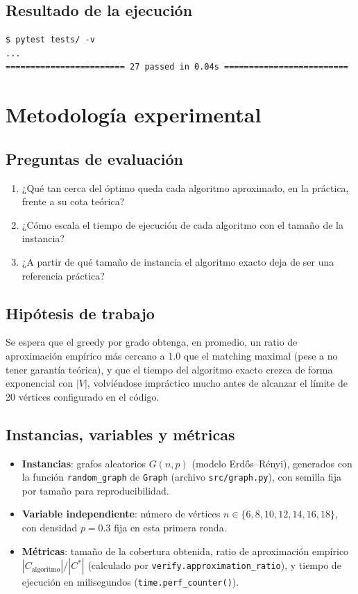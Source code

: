 \documentclass[11pt,a4paper]{article}
\begin{document}
\subsection{Resultado de la ejecución}
\begin{lstlisting}
$ pytest tests/ -v
...
======================== 27 passed in 0.04s =========================
\end{lstlisting}

\section{Metodología experimental}
\label{sec:metodologia}

\subsection{Preguntas de evaluación}
\begin{enumerate}[itemsep=2pt]
	\item ¿Qué tan cerca del óptimo queda cada algoritmo aproximado, en la práctica, frente
	a su cota teórica?
	\item ¿Cómo escala el tiempo de ejecución de cada algoritmo con el tamaño de la
	instancia?
	\item ¿A partir de qué tamaño de instancia el algoritmo exacto deja de ser una
	referencia práctica?
\end{enumerate}

\subsection{Hipótesis de trabajo}
Se espera que el greedy por grado obtenga, en promedio, un ratio de aproximación empírico
más cercano a 1.0 que el matching maximal (pese a no tener garantía teórica), y que el
tiempo del algoritmo exacto crezca de forma exponencial con $|V|$, volviéndose impráctico
mucho antes de alcanzar el límite de 20 vértices configurado en el código.

\subsection{Instancias, variables y métricas}
\begin{itemize}
	\item \textbf{Instancias}: grafos aleatorios $G(n,p)$ (modelo Erdős–Rényi), generados
	con la función \texttt{random\_graph} de \texttt{Graph} (archivo \texttt{src/graph.py}),
	con semilla fija por tamaño para reproducibilidad.
	\item \textbf{Variable independiente}: número de vértices
	$n \in \{6, 8, 10, 12, 14, 16, 18\}$, con densidad $p=0.3$ fija en esta primera ronda.
	\item \textbf{Métricas}: tamaño de la cobertura obtenida, ratio de aproximación empírico
	$|C_{\text{algoritmo}}|/|C^{*}|$ (calculado por \texttt{verify.approximation\_ratio}), y
	tiempo de ejecución en milisegundos (\texttt{time.perf\_counter()}).
\end{itemize}
\end{document}
